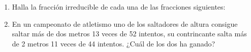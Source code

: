 \documentclass[10pt,twoside]{article}
\begin{document}
\begin{enumerate}
\begin{enumerate}
\end{enumerate}
\item Halla la fracción irreducible de cada una de las fracciones siguientes:
\begin{enumerate}
\end{enumerate}
\item En un campeonato de atletismo uno de los saltadores de altura consigue saltar más de dos metros 13 veces de 52 intentos, su contrincante salta más de 2 metros 11 veces de 44 intentos. ¿Cuál de los dos ha ganado?
\end{enumerate}
\end{document}
